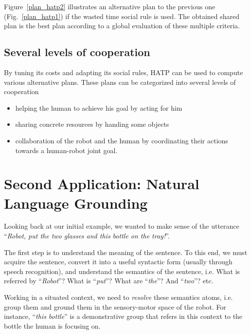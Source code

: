 \documentclass{svmult}
\newcommand{\ie}{i.e.\xspace}
\begin{document}
Figure~\ref{plan_hatp2} illustrates an alternative plan to the previous 
one (Fig.~\ref{plan_hatp1}) if the wasted time social rule is used.
The obtained shared plan is the best plan according to a global evaluation of
these multiple criteria.

\subsection*{Several levels of cooperation} 

By tuning its costs and adapting its social rules, HATP can be used to compute
various alternative plans. These plans can be categorized into several levels
of cooperation

\begin{itemize}
\item helping the human to achieve his goal by acting for him
\item sharing concrete resources by handing some objects
\item collaboration of the robot and the human by coordinating their
  actions towards a human-robot joint goal.
\end{itemize}




\section{Second Application: Natural Language Grounding}
\label{dialogs}

Looking back at our initial example, we wanted to make sense of the utterance
``\emph{Robot, put the two glasses and this bottle on the tray!}''.

The first step is to understand the meaning of the sentence. To this end, we
must acquire the sentence, convert it into a useful syntactic form (usually
through speech recognition), and understand the semantics of the sentence, \ie
What is referred by ``\textit{Robot}''? What is ``\textit{put}''? What are
``\textit{the}''? And ``\textit{two}''? etc.

Working in a situated context, we need to \emph{resolve} these semantics atoms,
\ie group them and ground them in the sensory-motor space of the robot. For instance,
``\textit{this bottle}'' is a demonstrative group that refers in this context to the
bottle the human is focusing on.
\end{document}
